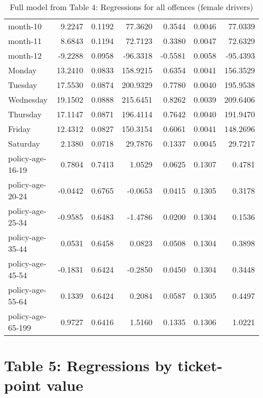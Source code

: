 \documentclass[10pt]{article}
\begin{document}
\begin{table}[ht]
\begin{tabular}{lrrrrrr}
  month-10 & 9.2247 & 0.1192 & 77.3620 & 0.3544 & 0.0046 & 77.0339 \\ 
  month-11 & 8.6843 & 0.1194 & 72.7123 & 0.3380 & 0.0047 & 72.6329 \\ 
  month-12 & -9.2288 & 0.0958 & -96.3318 & -0.5581 & 0.0058 & -95.4393 \\ 
  Monday & 13.2410 & 0.0833 & 158.9215 & 0.6354 & 0.0041 & 156.3529 \\ 
  Tuesday & 17.5530 & 0.0874 & 200.9329 & 0.7780 & 0.0040 & 195.9538 \\ 
  Wednesday & 19.1502 & 0.0888 & 215.6451 & 0.8262 & 0.0039 & 209.6406 \\ 
  Thursday & 17.1147 & 0.0871 & 196.4114 & 0.7642 & 0.0040 & 191.9470 \\ 
  Friday & 12.4312 & 0.0827 & 150.3154 & 0.6061 & 0.0041 & 148.2696 \\ 
  Saturday & 2.1380 & 0.0718 & 29.7876 & 0.1337 & 0.0045 & 29.7217 \\ 
  policy-age-16-19 & 0.7804 & 0.7413 & 1.0529 & 0.0625 & 0.1307 & 0.4781 \\ 
  policy-age-20-24 & -0.0442 & 0.6765 & -0.0653 & 0.0415 & 0.1305 & 0.3178 \\ 
  policy-age-25-34 & -0.9585 & 0.6483 & -1.4786 & 0.0200 & 0.1304 & 0.1536 \\ 
  policy-age-35-44 & 0.0531 & 0.6458 & 0.0823 & 0.0508 & 0.1304 & 0.3898 \\ 
  policy-age-45-54 & -0.1831 & 0.6424 & -0.2850 & 0.0450 & 0.1304 & 0.3448 \\ 
  policy-age-55-64 & 0.1339 & 0.6424 & 0.2084 & 0.0587 & 0.1305 & 0.4497 \\ 
  policy-age-65-199 & 0.9727 & 0.6416 & 1.5160 & 0.1335 & 0.1306 & 1.0221 \\ 
   \hline
\end{tabular}
\caption{Full model from Table 4: Regressions for all offences (female drivers)} 
\label{tab_4_all_pts_with_age_F}
\end{table}


\clearpage
\pagebreak




\section{Table 5: Regressions by ticket-point value}
\end{document}
